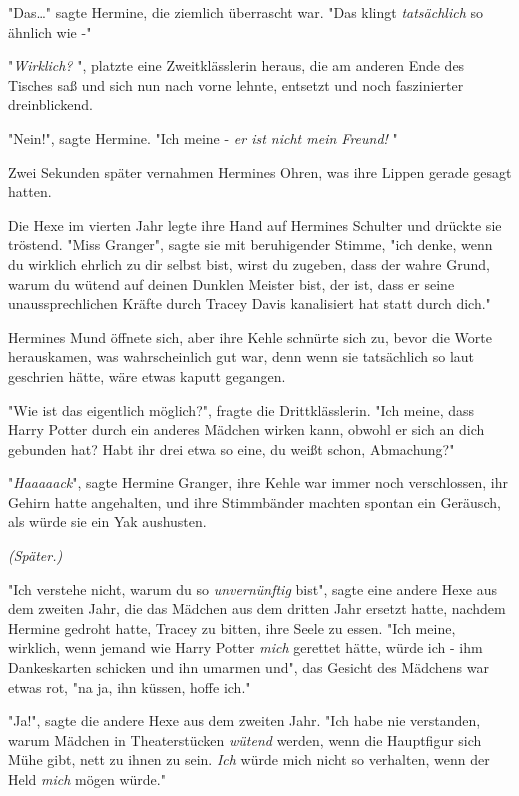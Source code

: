 {"Das…" sagte Hermine, die ziemlich überrascht war. "Das klingt \emph{tatsächlich} so ähnlich wie -"

"\emph{Wirklich?} ", platzte eine Zweitklässlerin heraus, die am anderen Ende des Tisches saß und sich nun nach vorne lehnte, entsetzt und noch faszinierter dreinblickend.

"Nein!", sagte Hermine. "Ich meine - \emph{er ist nicht mein Freund!} "

Zwei Sekunden später vernahmen Hermines Ohren, was ihre Lippen gerade gesagt hatten.

Die Hexe im vierten Jahr legte ihre Hand auf Hermines Schulter und drückte sie tröstend. "Miss Granger", sagte sie mit beruhigender Stimme, "ich denke, wenn du wirklich ehrlich zu dir selbst bist, wirst du zugeben, dass der wahre Grund, warum du wütend auf deinen Dunklen Meister bist, der ist, dass er seine unaussprechlichen Kräfte durch Tracey Davis kanalisiert hat statt durch dich."

Hermines Mund öffnete sich, aber ihre Kehle schnürte sich zu, bevor die Worte herauskamen, was wahrscheinlich gut war, denn wenn sie tatsächlich so laut geschrien hätte, wäre etwas kaputt gegangen.

"Wie ist das eigentlich möglich?", fragte die Drittklässlerin. "Ich meine, dass Harry Potter durch ein anderes Mädchen wirken kann, obwohl er sich an dich gebunden hat? Habt ihr drei etwa so eine, du weißt schon, Abmachung?"

"\emph{Haaaaack}", sagte Hermine Granger, ihre Kehle war immer noch verschlossen, ihr Gehirn hatte angehalten, und ihre Stimmbänder machten spontan ein Geräusch, als würde sie ein Yak aushusten.

\emph{\emph{(Später.)}}

"Ich verstehe nicht, warum du so \emph{unvernünftig} bist", sagte eine andere Hexe aus dem zweiten Jahr, die das Mädchen aus dem dritten Jahr ersetzt hatte, nachdem Hermine gedroht hatte, Tracey zu bitten, ihre Seele zu essen. "Ich meine, wirklich, wenn jemand wie Harry Potter \emph{mich} gerettet hätte, würde ich - ihm Dankeskarten schicken und ihn umarmen und", das Gesicht des Mädchens war etwas rot, "na ja, ihn küssen, hoffe ich."

"Ja!", sagte die andere Hexe aus dem zweiten Jahr. "Ich habe nie verstanden, warum Mädchen in Theaterstücken \emph{wütend} werden, wenn die Hauptfigur sich Mühe gibt, nett zu ihnen zu sein. \emph{Ich} würde mich nicht so verhalten, wenn der Held \emph{mich} mögen würde."

}
